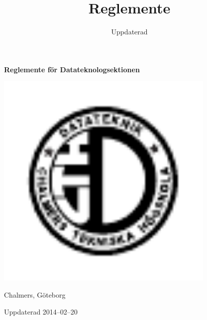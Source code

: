 \documentclass{dtek}
\title{Reglemente}
\date{Uppdaterad \updated}
\newcommand{\updated}{2014--02--20}
\begin{document}
\makeheadfoot%

\begin{center}
  {\Huge \textbf{Reglemente för Datateknologsektionen}}
  
  \includegraphics[width=300pt]{Datalogo.pdf}
  
  {\LARGE Chalmers, Göteborg}

  \vspace{2cm}

  {\LARGE Uppdaterad \updated}
\end{center}

\newpage

\setcounter{tocdepth}{2}
\tableofcontents

\newpage

\end{document}

